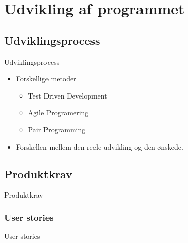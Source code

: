 \section{Udvikling af programmet}
\subsection{Udviklingsprocess}
\begin{frame}{Udviklingsprocess}
	\begin{itemize}
		\item Forskellige metoder
			\begin{itemize}
				\item Test Driven Development
				\item Agile Programering
				\item Pair Programming
			\end{itemize}
		\item Forskellen mellem den reele udvikling og den ønskede.
	\end{itemize}
\end{frame}

\subsection{Produktkrav}
\begin{frame}{Produktkrav}
	
\end{frame}

\subsubsection{User stories}
\begin{frame}{User stories}

\end{frame}

